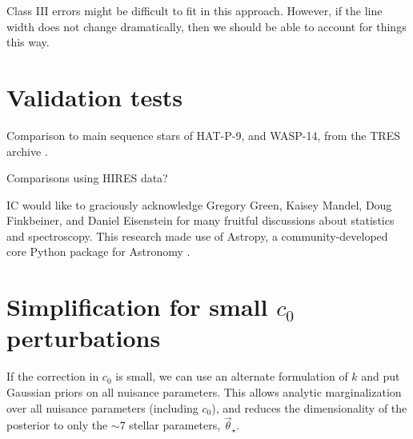 \documentclass[preprint]{aastex} %
\newcommand{\vt}{\vec{\theta}}
\newcommand{\vstar}{\vt_{\star}}
\begin{document}
Class III errors might be difficult to fit in this approach. However, if the line width does not change dramatically, then we should be able to account for things this way.

\section{Validation tests}
Comparison to main sequence stars of HAT-P-9, and WASP-14, from the TRES archive \citep{tfs+12}.

Comparisons using HIRES data?


\acknowledgments
IC would like to graciously acknowledge Gregory Green, Kaisey Mandel, Doug Finkbeiner, and Daniel Eisenstein for many fruitful discussions about statistics and spectroscopy. This research made use of Astropy, a community-developed core Python package for Astronomy \citep{art+13}.

\appendix

\section{Simplification for small $c_0$ perturbations}
\label{sec:gaussian_simplification}
If the correction in $c_0$ is small, we can use an alternate formulation of $k$ and put Gaussian priors on all nuisance parameters. This allows analytic marginalization over all nuisance parameters (including $c_0$), and reduces the dimensionality of the posterior to only the $\sim 7$ stellar parameters, $\vstar$.
\end{document}
